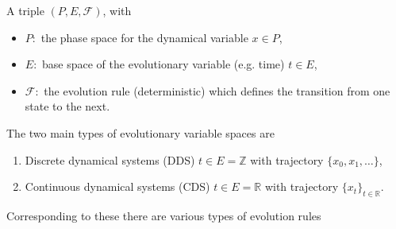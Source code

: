 \begin{definition}
	A triple $(P,E, \mathcal{F})$, with
	\begin{itemize}
		\item $P :$ the phase space for the dynamical variable ${x} \in P$,
		\item  $E:$ base space of the evolutionary variable (e.g. time) $t \in E$,
		\item $\mathcal{F}: $ the evolution rule (deterministic) which defines the transition from one state to the next.
\end{itemize}
\end{definition}
The two main types of evolutionary variable spaces are
\begin{enumerate}
	\item Discrete dynamical systems (DDS) $t\in E=\mathbb{Z}$ with trajectory $\{ {x}_0,  {x}_1, \ldots\}$,
	\item Continuous dynamical systems (CDS) $t\in E=\mathbb{R}$ with trajectory $\{ {x}_t\}_{t \in \mathbb{R}}$.
\end{enumerate}
Corresponding to these there are various types of evolution rules
